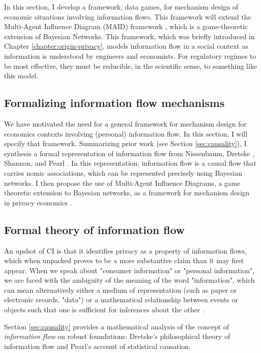 \documentclass[../thesis.tex]{subfiles}
\begin{document}
In this section, I develop a framework, data games, for mechanism
design of economic situations involving information flows.
This framework will extend the Multi-Agent Influence Diagram
(MAID) framework \cite{koller2003multi}, which is a
game-theoretic extension of Bayesian Networks.
This framework, which was briefly introduced in Chapter
\ref{chapter:origin-privacy},
models information flow in a social context as information
is understood by engineers and economists.
For regulatory regimes to be most effective, they must
be reducible, in the scientific sense, to something like
this model.

\subsection{Formalizing information flow mechanisms}
\label{sec:formalizing}

We have motivated the need for a general framework
for mechanism design for economics contexts involving
(personal) information flow.
In this section, I will specify that framework.
Summarizing prior work (see Section \ref{sec:causality}),
I synthesis a formal representation
of information flow from Nissenbaum,
Dretske \cite{dretske1981knowledge},
Shannon,
and Pearl \cite{pearl1988probabilistic}.
In this representation, information flow is a causal flow
that carries nomic associations, which can be represented
precisely using Bayesian networks.
I then propose the use of Multi-Agent Influence Diagrams,
a game theoretic extension to Bayesian networks, as
a framework for mechanism design in privacy economics
\cite{koller2003multi}.

\subsection{Formal theory of information flow}

An upshot of CI is that it identifies privacy as a 
property of information flows, which when unpacked proves
to be a more substantive claim than it may first appear.
When we speak about "consumer information" or 
"personal information", we are faced with the ambiguity
of the meaning of the word "information", which can mean
alternatively either a medium of representation (such as
paper or electronic records, "data") or a mathematical
relationship between events or objects such that one
is sufficient for inferences about the other
\cite{nunberg1996farewell}.

Section \ref{sec:causality} provides a mathematical
analysis of the concept of \emph{information flow}
on robust foundations: Dretske's philosophical theory
of information flow and Pearl's account of statistical
causation.
\end{document}
